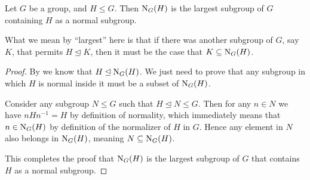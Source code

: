 \begin{proposition}\label{prop-normalizer-of-subgroup-is-largest-subgroup-containing-that-subgroup-as-a-normal-subgroup}
    Let $G$ be a group, and $H \leq G$. Then $\mathrm{N}_{G}(H)$ is the largest subgroup of $G$ containing $H$ as a normal subgroup.
\end{proposition}
\begin{remark}
    What we mean by ``largest'' here is that if there was another subgroup of $G$, say $K$, that permits $H \unlhd K$, then it must be the case that $K \subseteq \mathrm{N}_{G}(H)$.
\end{remark}
\begin{proof}
    By  we know that $H \unlhd \mathrm{N}_{G}(H)$. We just need to prove that any subgroup in which $H$ is normal inside it must be a subset of $\mathrm{N}_{G}(H)$.

    Consider any subgroup $N \leq G$ such that $H \unlhd N \leq G$. Then for any $n \in N$ we have $nHn^{-1} = H$ by definition of normality, which immediately means that $n \in \mathrm{N}_{G}(H)$ by definition of the normalizer of $H$ in $G$. Hence any element in $N$ also belongs in $\mathrm{N}_{G}(H)$, meaning $N \subseteq \mathrm{N}_{G}(H)$.

    This completes the proof that $\mathrm{N}_{G}(H)$ is the largest subgroup of $G$ that contains $H$ as a normal subgroup.
\end{proof}

